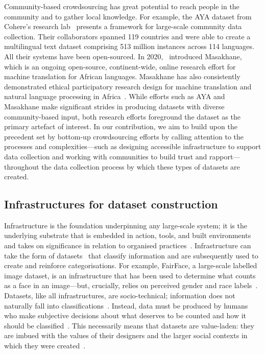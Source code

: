 Community-based crowdsourcing has great potential to reach people in the community and to gather local knowledge. For example, the AYA dataset from Cohere's research lab~\cite{singh2024aya_dataset} presents a framework for large-scale community data collection. Their collaborators spanned 119 countries and were able to create a multilingual text dataset comprising 513 million instances across 114 languages. All their systems have been open-sourced. In 2020,~\citet{orife2020masakhaneoriginal} introduced Masakhane, which is an ongoing open-source, continent-wide, online research effort for machine translation for African languages. Masakhane has also consistently demonstrated ethical participatory research design for machine translation and natural language processing in Africa~\cite{nekoto2020masakhane, adelani2022masakhaner,ogundepo2023afriqamasakhane}. While efforts such as AYA and Masakhane make significant strides in producing datasets with diverse community-based input, both research efforts foreground the dataset as the primary artefact of interest. In our contribution, we aim to build upon the precedent set by bottom-up crowdsourcing efforts by calling attention to the processes and complexities---such as designing accessible infrastructure to support data collection and working with communities to build trust and rapport---throughout the data collection process by which these types of datasets are created. 

\subsection{Infrastructures for dataset construction}
Infrastructure is the foundation underpinning any large-scale system; it is the underlying substrate that is embedded in action, tools, and built environments and takes on significance in relation to organised practices~\cite{star1999ethnography,star201620,rice2006handbook}. Infrastructure can take the form of datasets~\cite{bowker2000sorting} that classify information and are subsequently used to create and reinforce categorisations. For example, FairFace, a large-scale labelled image dataset, is an infrastructure that has been used to determine what counts as a face in an image---but, crucially, relies on perceived gender and race labels~\cite{karkkainen2021fairface}. Datasets, like all infrastructures, are socio-technical; information does not naturally fall into classifications~\cite{bowker1994information,bowker2000sorting,star1999ethnography}. Instead, data must be produced by humans who make subjective decisions about what deserves to be counted and how it should be classified~\cite{d2024counting,denton2021whose}. This necessarily means that datasets are value-laden: they are imbued with the values of their designers and the larger social contexts in which they were created~\cite{rice2006handbook,star1999ethnography,scheuermanDatasetsHavePolitics2021,d2023data}. 

